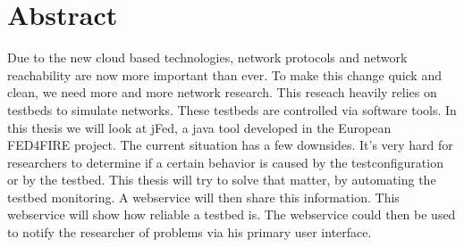 \newpage
\chapter*{Abstract}
\npar
Due to the new cloud based technologies, network protocols and network reachability are now more important than ever. To make this change quick and clean, we need more and more network research. This reseach heavily relies on testbeds to simulate networks. These testbeds are controlled via software tools. In this thesis we will look at jFed, a java tool developed in the European FED4FIRE project. The current situation has a few downsides. It's very hard for researchers to determine if a certain behavior is caused by the testconfiguration or by the testbed. 
\npar
This thesis will try to solve that matter, by automating the testbed monitoring.
A webservice will then share this information. This webservice will show how reliable a testbed is. The webservice could then be used to notify the researcher of problems via his primary user interface.